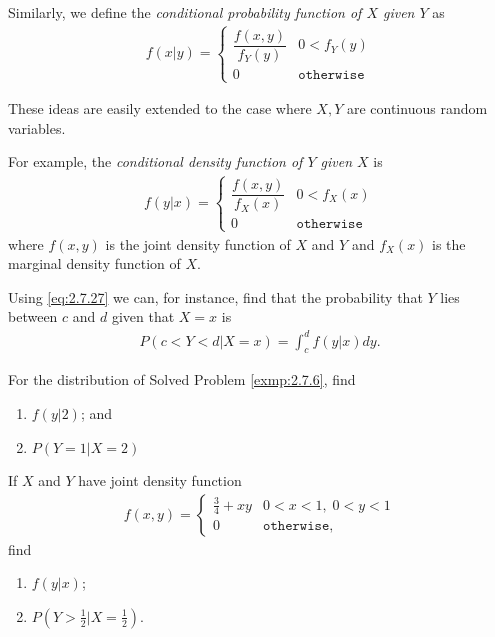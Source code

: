  Similarly, we define the \emph{conditional probability function of $X$ given $Y$} as
 \begin{align}
  \label{eq:2.7.26}
  f(x|y)=
  \begin{cases}
   \dfrac{f(x,y)}{f_{Y}(y)} & 0 < f_{Y}(y)  \\
   0 & \texttt{otherwise}
  \end{cases}
 \end{align}

 These ideas are easily extended to the case where $X,Y$ are continuous random variables.

 For example, the \emph{conditional density function of $Y$ given $X$} is
 \begin{align}
  \label{eq:2.7.27}
  f(y|x)=
    \begin{cases}
   \dfrac{f(x,y)}{f_{X}(x)} & 0 < f_{X}(x)  \\
   0 & \texttt{otherwise}
  \end{cases}
 \end{align}
 where $f(x,y)$ is the joint density function of $X$ and $Y$ and $f_{X}(x)$ is the marginal density function of $X.$

 Using \eqref{eq:2.7.27} we can, for instance, find that the probability that $Y$ lies between $c$ and $d$ given that $X=x$ is
 \begin{align}
  \label{eq:2.7.28}P(c<Y<d|X=x)=
  \int_{c}^{d}f(y|x)dy.
 \end{align}

 \begin{ejemplo}
  \label{exmp:2.7.13}
  For the distribution of Solved Problem \ref{exmp:2.7.6}, find
  \begin{enumerate}
   \item $f(y|2)$; and
   \item $P(Y=1|X=2)$
  \end{enumerate}
 \end{ejemplo}

\begin{ejemplo}
 \label{exmp:2.7.14}
  If $X$ and $Y$ have joint density function
 \begin{align}
  f(x,y)=
  \begin{cases}
   \frac{3}{4}+xy & 0<x<1, \; 0<y<1 \\
   0 & \texttt{otherwise},
  \end{cases}
 \end{align}
find
\begin{enumerate}
 \item $f(y|x)$; 
 \item $P(Y>\frac{1}{2}| X = \frac{1}{2} )$.
\end{enumerate}
\end{ejemplo}

